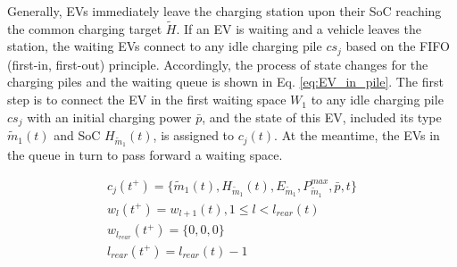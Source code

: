 \documentclass[preprint,12pt]{elsarticle}
\begin{document}
Generally, EVs immediately leave the charging station upon their SoC reaching the common charging target $\tilde{H}$. If an EV is waiting and a vehicle leaves the station, the waiting EVs connect to any idle charging pile $cs_{j}$ based on the FIFO (first-in, first-out) principle. Accordingly, the process of state changes for the charging piles and the waiting queue is shown in Eq. \ref{eq:EV_in_pile}. The first step is to connect the EV in the first waiting space $W_{1}$ to any idle charging pile $cs_{j}$ with an initial charging power $\bar{p}$, and the state of this EV, included its type $\tilde{m}_{1}(t)$ and SoC $H_{\tilde{m}_{1}}(t)$, is assigned to $c_{j}(t)$. At the meantime, the EVs in the queue in turn to pass forward a waiting space.

\begin{equation}
\begin{array}{c}
c_{j}(t^{+})=\{\tilde{m}_{1}(t),H_{\tilde{m}_{1}}(t),E_{\tilde{m}_{1}},P_{\tilde{m}_{1}}^{max},\bar{p},t\}\\
w_{l}(t^{+})=w_{l+1}(t),1\leq l<l_{rear}(t)\\
w_{l_{rear}}(t^{+})=\{0,0,0\}\\
l_{rear}(t^{+})=l_{rear}(t)-1
\end{array}\label{eq:EV_in_pile}
\end{equation}
\end{document}

